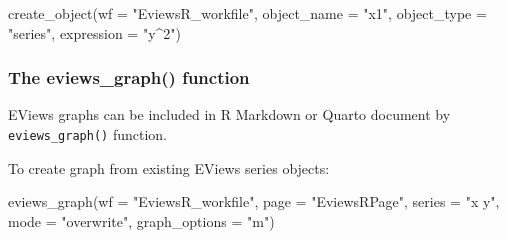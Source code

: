 \documentclass[
  letterpaper,
  DIV=11,
  numbers=noendperiod]{scrartcl}
\newenvironment{Shaded}{\begin{snugshade}}{\end{snugshade}}
\newcommand{\AttributeTok}[1]{\textcolor[rgb]{0.40,0.45,0.13}{#1}}
\newcommand{\FunctionTok}[1]{\textcolor[rgb]{0.28,0.35,0.67}{#1}}
\newcommand{\NormalTok}[1]{\textcolor[rgb]{0.00,0.23,0.31}{#1}}
\newcommand{\StringTok}[1]{\textcolor[rgb]{0.13,0.47,0.30}{#1}}
\begin{document}
\begin{figure}

\end{figure}

\begin{Shaded}
\begin{Highlighting}[]
\FunctionTok{create\_object}\NormalTok{(}\AttributeTok{wf =} \StringTok{"EviewsR\_workfile"}\NormalTok{, }\AttributeTok{object\_name =} \StringTok{"x1"}\NormalTok{, }\AttributeTok{object\_type =} \StringTok{"series"}\NormalTok{,}
    \AttributeTok{expression =} \StringTok{"y\^{}2"}\NormalTok{)}
\end{Highlighting}
\end{Shaded}

\begin{figure}

\end{figure}

\hypertarget{the-eviews_graph-function}{%
\subsubsection{The eviews\_graph()
function}\label{the-eviews_graph-function}}

EViews graphs can be included in R Markdown or Quarto document by
\texttt{eviews\_graph()} function.

To create graph from existing EViews series objects:

\begin{Shaded}
\begin{Highlighting}[]
\FunctionTok{eviews\_graph}\NormalTok{(}\AttributeTok{wf =} \StringTok{"EviewsR\_workfile"}\NormalTok{, }\AttributeTok{page =} \StringTok{"EviewsRPage"}\NormalTok{, }\AttributeTok{series =} \StringTok{"x y"}\NormalTok{,}
    \AttributeTok{mode =} \StringTok{"overwrite"}\NormalTok{, }\AttributeTok{graph\_options =} \StringTok{"m"}\NormalTok{)}
\end{Highlighting}
\end{Shaded}
\end{document}

